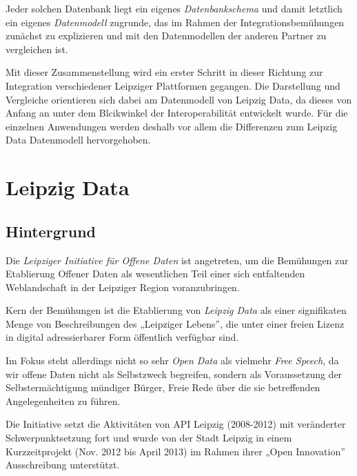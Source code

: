 \documentclass[a4paper,11pt]{article}
\begin{document}
Jeder solchen Datenbank liegt ein eigenes \emph{Datenbankschema} und damit
letztlich ein eigenes \emph{Datenmodell} zugrunde, das im Rahmen der
Integrationsbemühungen zunächst zu explizieren und mit den Datenmodellen der
anderen Partner zu vergleichen ist. 

Mit dieser Zusammenstellung wird ein erster Schritt in dieser Richtung zur
Integration verschiedener Leipziger Plattformen gegangen.  Die Darstellung und
Vergleiche orientieren sich dabei am Datenmodell von Leipzig Data, da dieses
von Anfang an unter dem Blcikwinkel der Interoperabilität entwickelt wurde.
Für die einzelnen Anwendungen werden deshalb vor allem die Differenzen zum
Leipzig Data Datenmodell hervorgehoben. 
\newpage

\section{Leipzig Data}

\subsection{Hintergrund}

Die \emph{Leipziger Initiative für Offene Daten} ist angetreten, um die
Bemühungen zur Etablierung Offener Daten als wesentlichen Teil einer sich
entfaltenden Weblandschaft in der Leipziger Region voranzubringen.

Kern der Bemühungen ist die Etablierung von \emph{Leipzig Data} als einer
signifikaten Menge von Beschreibungen des „Leipziger Lebens”, die unter einer
freien Lizenz in digital adressierbarer Form öffentlich verfügbar sind.

Im Fokus steht allerdings nicht so sehr \emph{Open Data} als vielmehr
\emph{Free Speech}, da wir offene Daten nicht als Selbstzweck begreifen,
sondern als Voraussetzung der Selbstermächtigung mündiger Bürger, Freie Rede
über die sie betreffenden Angelegenheiten zu führen.

Die Initiative setzt die Aktivitäten von API Leipzig (2008-2012) mit
veränderter Schwerpunktsetzung fort und wurde von der Stadt Leipzig in einem
Kurzzeitprojekt (Nov. 2012 bis April 2013) im Rahmen ihrer „Open Innovation”
Ausschreibung unterstützt.
 
\end{document}
